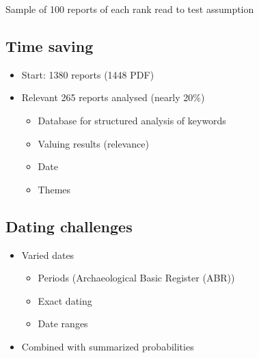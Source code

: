 \documentclass[
  letterpaper,
  DIV=11,
  numbers=noendperiod]{scrartcl}
\providecommand{\tightlist}{%
  \setlength{\itemsep}{0pt}\setlength{\parskip}{0pt}}\usepackage{longtable,booktabs,array}
\begin{document}
Sample of 100 reports of each rank read to test assumption

\hypertarget{time-saving}{%
\subsection{Time saving}\label{time-saving}}

\begin{itemize}
\tightlist
\item
  Start: 1380 reports (1448 PDF)
\item
  Relevant 265 reports analysed (nearly 20\%)

  \begin{itemize}
  \tightlist
  \item
    Database for structured analysis of keywords
  \item
    Valuing results (relevance)
  \item
    Date
  \item
    Themes
  \end{itemize}
\end{itemize}

\hypertarget{dating-challenges}{%
\subsection{Dating challenges}\label{dating-challenges}}

\begin{itemize}
\tightlist
\item
  Varied dates

  \begin{itemize}
  \tightlist
  \item
    Periods (Archaeological Basic Register (ABR))
  \item
    Exact dating
  \item
    Date ranges
  \end{itemize}
\item
  Combined with summarized probabilities
\end{itemize}
\end{document}
